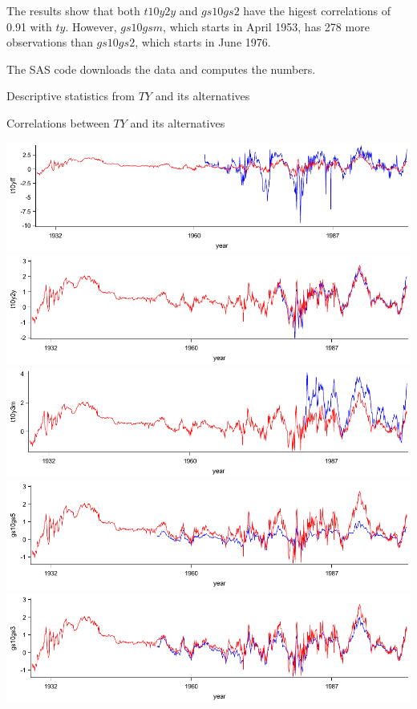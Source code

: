 \documentclass{article}
\begin{document}
The results show that both $t10y2y$ and $gs10gs2$ have the higest correlations of 0.91 with $ty$. However, $gs10gsm$, which starts in April 1953, has 278 more observations than $gs10gs2$, which starts in June 1976.

The SAS code downloads the data and computes the numbers.

\begin{landscape}
\begin{table}
\centering
\caption*{Descriptive statistics from $TY$ and its alternatives}
\end{table}

\begin{table}
\centering
\caption*{Correlations between $TY$ and its alternatives}
\end{table}
\end{landscape}

\noindent
\includegraphics{series/t10yff}\\
\includegraphics{series/t10y2y}\\
\includegraphics{series/t10y3m}\\
\includegraphics{series/gs10gs5}\\
\includegraphics{series/gs10gs3}
\clearpage
\end{document}
